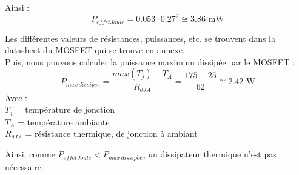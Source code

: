Ainsi :
\begin{equation}
    P_{effetJoule} = 0.053\cdot 0.27^2 \cong 3.86 \text{ mW}
\end{equation}

Les différentes valeurs de résistances, puissances, etc. se trouvent dans la datasheet du MOSFET qui se trouve en annexe. \\

Puis, nous pouvons calculer la puissance maximum dissipée par le MOSFET :
\[P_{max\,dissip\acute{e}e} = \frac{max(T_j) - T_A}{R_{\theta JA}} = \frac{175-25}{62}\cong 2.42 \text{ W}\]
Avec :\\
$T_j$ = température de jonction\\
$T_A$ = température ambiante\\
$R_{\theta JA}$ = résistance thermique, de jonction à ambiant

Ainsi, comme $P_{effetJoule} < P_{max\,dissip\acute{e}e}$, un dissipateur thermique n'est pas nécessaire. \\

